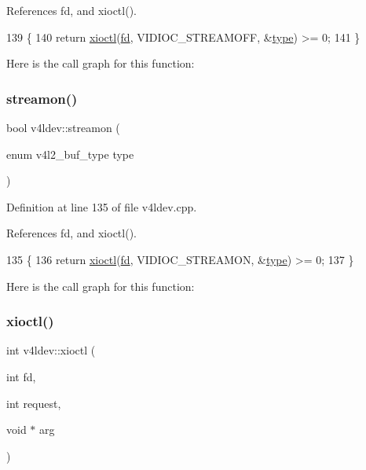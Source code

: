 References fd, and xioctl().


\begin{DoxyCode}
139                                               \{
140     \textcolor{keywordflow}{return} \hyperlink{classv4ldev_ab93cb1ab18254ca362310b006bd2552d}{xioctl}(\hyperlink{classv4ldev_a2cd44be3be75a19ab8bec12b28e29142}{fd}, VIDIOC\_STREAMOFF, &\hyperlink{classstd_1_1conditional_1_1type}{type}) >= 0;
141 \}
\end{DoxyCode}
Here is the call graph for this function\+:
\mbox{\label{classv4ldev_a930d11206b595e7f27c7ca240ce332f4}} 
\subsubsection{\texorpdfstring{streamon()}{streamon()}}
{\footnotesize\ttfamily bool v4ldev\+::streamon (\begin{DoxyParamCaption}\item[{enum v4l2\+\_\+buf\+\_\+type}]{type }\end{DoxyParamCaption})}



Definition at line 135 of file v4ldev.\+cpp.



References fd, and xioctl().


\begin{DoxyCode}
135                                              \{
136     \textcolor{keywordflow}{return} \hyperlink{classv4ldev_ab93cb1ab18254ca362310b006bd2552d}{xioctl}(\hyperlink{classv4ldev_a2cd44be3be75a19ab8bec12b28e29142}{fd}, VIDIOC\_STREAMON, &\hyperlink{classstd_1_1conditional_1_1type}{type}) >= 0;
137 \}
\end{DoxyCode}
Here is the call graph for this function\+:
\mbox{\label{classv4ldev_ab93cb1ab18254ca362310b006bd2552d}} 
\subsubsection{\texorpdfstring{xioctl()}{xioctl()}}
{\footnotesize\ttfamily int v4ldev\+::xioctl (\begin{DoxyParamCaption}\item[{int}]{fd,  }\item[{int}]{request,  }\item[{void $\ast$}]{arg }\end{DoxyParamCaption})\hspace{0.3cm}{\ttfamily [private]}}



